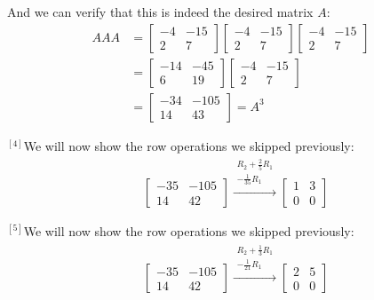 \documentclass{article}
\begin{document}
And we can verify that this is indeed the desired matrix $A$:
\begin{align*}
  AAA&=\begin{bmatrix}
    -4&-15\\2&7
  \end{bmatrix}\begin{bmatrix}
    -4&-15\\2&7
  \end{bmatrix}\begin{bmatrix}
    -4&-15\\2&7
  \end{bmatrix}\\
&=\begin{bmatrix}-14&-45\\ 6&19\end{bmatrix}\begin{bmatrix}
  -4&-15\\2&7
\end{bmatrix}\\
&=\begin{bmatrix}
  -34&-105\\14&43
\end{bmatrix}=A^3
\end{align*}

$\phantom{}^{[4]}$We will now show the row operations we skipped previously:
\begin{align*} 
  &\left[\begin{array}{rr}
    -35&-105\\14&42
    \end{array} \right]
    \xrightarrow{\substack{R_2+\frac{2}{5}R_1\\-\frac{1}{35}R_1}} 
    \left[\begin{array}{rrr}
      1&3\\0&0
    \end{array} \right]
\end{align*}

$\phantom{}^{[5]}$We will now show the row operations we skipped previously:
\begin{align*} 
  &\left[\begin{array}{rr}
    -35&-105\\14&42
    \end{array} \right]
    \xrightarrow{\substack{R_2+\frac{1}{3}R_1\\-\frac{1}{21}R_1}} 
    \left[\begin{array}{rrr}
      2&5\\0&0
    \end{array} \right]
\end{align*}
\end{document}
